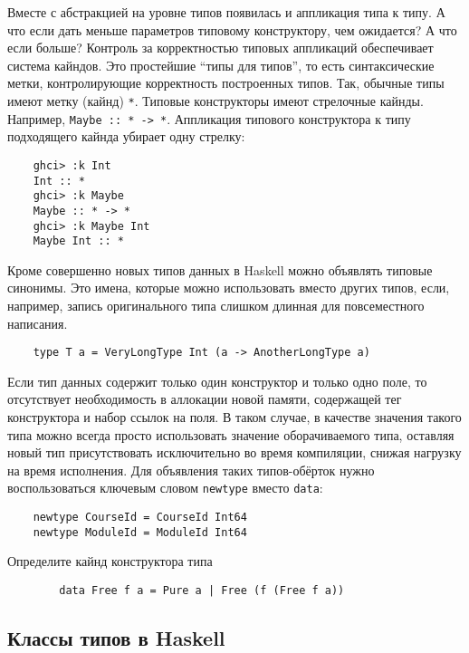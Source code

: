 Вместе с абстракцией на уровне типов появилась и аппликация типа к типу.
А что если дать меньше параметров типовому конструктору, чем ожидается?
А что если больше?
Контроль за корректностью типовых аппликаций обеспечивает система кайндов.
Это простейшие ``типы для типов'', то есть синтаксические метки, контролирующие корректность построенных типов.
Так, обычные типы имеют метку (кайнд) \texttt{*}.
Типовые конструкторы имеют стрелочные кайнды.
Например, \texttt{Maybe :: * -> *}.
Аппликация типового конструктора к типу подходящего кайнда убирает одну стрелку:
\begin{verbatim}
    ghci> :k Int
    Int :: *
    ghci> :k Maybe
    Maybe :: * -> *
    ghci> :k Maybe Int
    Maybe Int :: *
\end{verbatim}

Кроме совершенно новых типов данных в Haskell можно объявлять типовые синонимы.
Это имена, которые можно использовать вместо других типов, если, например, запись оригинального типа слишком длинная для повсеместного написания.
\begin{verbatim}
    type T a = VeryLongType Int (a -> AnotherLongType a)
\end{verbatim}

Если тип данных содержит только один конструктор и только одно поле, то отсутствует необходимость в аллокации новой памяти, содержащей тег конструктора и набор ссылок на поля.
В таком случае, в качестве значения такого типа можно всегда просто использовать значение оборачиваемого типа, оставляя новый тип присутствовать исключительно во время компиляции, снижая нагрузку на время исполнения.
Для объявления таких типов-обёрток нужно воспользоваться ключевым словом \texttt{newtype} вместо \texttt{data}:
\begin{verbatim}
    newtype CourseId = CourseId Int64
    newtype ModuleId = ModuleId Int64
\end{verbatim}

\begin{task}
    Определите кайнд конструктора типа
    \begin{verbatim}
        data Free f a = Pure a | Free (f (Free f a))
    \end{verbatim}
\end{task}

\subsection{Классы типов в Haskell}

